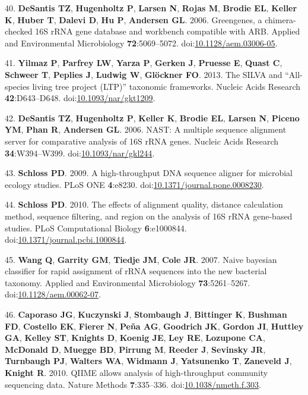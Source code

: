 \documentclass[11pt,]{article}
\begin{document}
\leavevmode\hypertarget{ref-DeSantis2006a}{}%
40. \textbf{DeSantis TZ}, \textbf{Hugenholtz P}, \textbf{Larsen N},
\textbf{Rojas M}, \textbf{Brodie EL}, \textbf{Keller K}, \textbf{Huber
T}, \textbf{Dalevi D}, \textbf{Hu P}, \textbf{Andersen GL}. 2006.
Greengenes, a chimera-checked 16S rRNA gene database and workbench
compatible with ARB. Applied and Environmental Microbiology
\textbf{72}:5069--5072.
doi:\href{https://doi.org/10.1128/aem.03006-05}{10.1128/aem.03006-05}.

\leavevmode\hypertarget{ref-Yilmaz2013}{}%
41. \textbf{Yilmaz P}, \textbf{Parfrey LW}, \textbf{Yarza P},
\textbf{Gerken J}, \textbf{Pruesse E}, \textbf{Quast C}, \textbf{Schweer
T}, \textbf{Peplies J}, \textbf{Ludwig W}, \textbf{Glöckner FO}. 2013.
The SILVA and ``All-species living tree project (LTP)'' taxonomic
frameworks. Nucleic Acids Research \textbf{42}:D643--D648.
doi:\href{https://doi.org/10.1093/nar/gkt1209}{10.1093/nar/gkt1209}.

\leavevmode\hypertarget{ref-DeSantis2006b}{}%
42. \textbf{DeSantis TZ}, \textbf{Hugenholtz P}, \textbf{Keller K},
\textbf{Brodie EL}, \textbf{Larsen N}, \textbf{Piceno YM}, \textbf{Phan
R}, \textbf{Andersen GL}. 2006. NAST: A multiple sequence alignment
server for comparative analysis of 16S rRNA genes. Nucleic Acids
Research \textbf{34}:W394--W399.
doi:\href{https://doi.org/10.1093/nar/gkl244}{10.1093/nar/gkl244}.

\leavevmode\hypertarget{ref-Schloss2009b}{}%
43. \textbf{Schloss PD}. 2009. A high-throughput DNA sequence aligner
for microbial ecology studies. PLoS ONE \textbf{4}:e8230.
doi:\href{https://doi.org/10.1371/journal.pone.0008230}{10.1371/journal.pone.0008230}.

\leavevmode\hypertarget{ref-Schloss2010a}{}%
44. \textbf{Schloss PD}. 2010. The effects of alignment quality,
distance calculation method, sequence filtering, and region on the
analysis of 16S rRNA gene-based studies. PLoS Computational Biology
\textbf{6}:e1000844.
doi:\href{https://doi.org/10.1371/journal.pcbi.1000844}{10.1371/journal.pcbi.1000844}.

\leavevmode\hypertarget{ref-Wang2007}{}%
45. \textbf{Wang Q}, \textbf{Garrity GM}, \textbf{Tiedje JM},
\textbf{Cole JR}. 2007. Naive bayesian classifier for rapid assignment
of rRNA sequences into the new bacterial taxonomy. Applied and
Environmental Microbiology \textbf{73}:5261--5267.
doi:\href{https://doi.org/10.1128/aem.00062-07}{10.1128/aem.00062-07}.

\leavevmode\hypertarget{ref-Caporaso2010a}{}%
46. \textbf{Caporaso JG}, \textbf{Kuczynski J}, \textbf{Stombaugh J},
\textbf{Bittinger K}, \textbf{Bushman FD}, \textbf{Costello EK},
\textbf{Fierer N}, \textbf{Peña AG}, \textbf{Goodrich JK},
\textbf{Gordon JI}, \textbf{Huttley GA}, \textbf{Kelley ST},
\textbf{Knights D}, \textbf{Koenig JE}, \textbf{Ley RE},
\textbf{Lozupone CA}, \textbf{McDonald D}, \textbf{Muegge BD},
\textbf{Pirrung M}, \textbf{Reeder J}, \textbf{Sevinsky JR},
\textbf{Turnbaugh PJ}, \textbf{Walters WA}, \textbf{Widmann J},
\textbf{Yatsunenko T}, \textbf{Zaneveld J}, \textbf{Knight R}. 2010.
QIIME allows analysis of high-throughput community sequencing data.
Nature Methods \textbf{7}:335--336.
doi:\href{https://doi.org/10.1038/nmeth.f.303}{10.1038/nmeth.f.303}.
\end{document}
